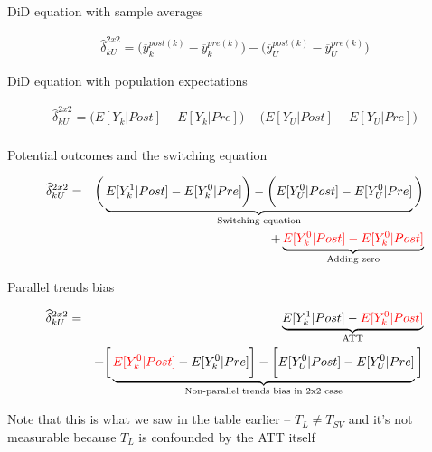 \documentclass{beamer}
\begin{document}
\begin{frame}{DiD equation with sample averages}

\begin{eqnarray*}
\widehat{\delta}^{2x2}_{kU} = \bigg ( \overline{y}_k^{post(k)} - \overline{y}_k^{pre(k)} \bigg ) - \bigg ( \overline{y}_U^{post(k)} - \overline{y}_U^{pre(k)} \bigg )
\end{eqnarray*}

\end{frame}

\begin{frame}{DiD equation with population expectations}

\begin{eqnarray*}
\widehat{\delta}^{2x2}_{kU} = \bigg ( E[Y_k|Post] - E[Y_k|Pre] \bigg ) - \bigg ( E[Y_U | Post ] - E[ Y_U | Pre] \bigg) \\
\end{eqnarray*}

\end{frame}


\begin{frame}{Potential outcomes and the switching equation}

\begin{eqnarray*}
\widehat{\delta}^{2x2}_{kU} &=& \bigg ( \underbrace{E[Y^1_k|Post] - E[Y^0_k|Pre] \bigg ) - \bigg ( E[Y^0_U | Post ] - E[ Y^0_U | Pre]}_{\mathclap{\text{Switching equation}}} \bigg)  \\
&&+ \underbrace{\textcolor{red}{E[Y_k^0 |Post] - E[Y^0_k | Post]}}_{\mathclap{\text{Adding zero}}} 
\end{eqnarray*}

\end{frame}

\begin{frame}{Parallel trends bias}

\begin{eqnarray*}
\widehat{\delta}^{2x2}_{kU} &=& \underbrace{E[Y^1_k | Post] - \textcolor{red}{E[Y^0_k | Post]}}_{\mathclap{\text{ATT}}} \\
&& + \bigg [  \underbrace{\textcolor{red}{E[Y^0_k | Post]} - E[Y^0_k | Pre] \bigg ] - \bigg [ E[Y^0_U | Post] - E[Y_U^0 | Pre] }_{\mathclap{\text{Non-parallel trends bias in 2x2 case}}} \bigg ]
\end{eqnarray*}

\bigskip

Note that this is what we saw in the table earlier -- $T_L \neq T_{SV}$ and it's not measurable because $T_L$ is confounded by the ATT itself


\end{frame}
\end{document}
